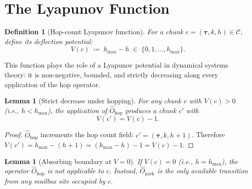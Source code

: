 \documentclass[11pt,a4paper]{article}
\newtheorem{lemma}[theorem]{Lemma}
\newtheorem{definition}{Definition}[section]
\begin{document}
\section{The Lyapunov Function}

\begin{definition}[Hop-count Lyapunov function]
\label{def:lyapunov}
For a chunk $c = (\bm{\tau}, k, h) \in \mathcal{C}$, define its
\emph{deflection potential}:
\[
  V(c) \;\coloneqq\; h_{\max} - h \;\in\; \{0, 1, \ldots, h_{\max}\}.
\]
\end{definition}

This function plays the role of a Lyapunov potential in dynamical
systems theory: it is non-negative, bounded, and strictly
decreasing along every application of the hop operator.

\begin{lemma}[Strict decrease under hopping]
\label{lem:decrease}
For any chunk $c$ with $V(c) > 0$ (i.e., $h < h_{\max}$), the
application of $\hat{O}_{\text{hop}}$ produces a chunk $c'$ with
\[
  V(c') = V(c) - 1.
\]
\end{lemma}

\begin{proof}
$\hat{O}_{\text{hop}}$ increments the hop count field:
$c' = (\bm{\tau}, k, h+1)$.  Therefore
$V(c') = h_{\max} - (h+1) = (h_{\max} - h) - 1 = V(c) - 1$.
\end{proof}

\begin{lemma}[Absorbing boundary at $V = 0$]
\label{lem:absorb}
If $V(c) = 0$ (i.e., $h = h_{\max}$), the operator
$\hat{O}_{\text{hop}}$ is not applicable to $c$.
Instead, $\hat{O}_{\text{park}}$ is the only available transition
from any mailbox site occupied by $c$.
\end{lemma}
\end{document}
